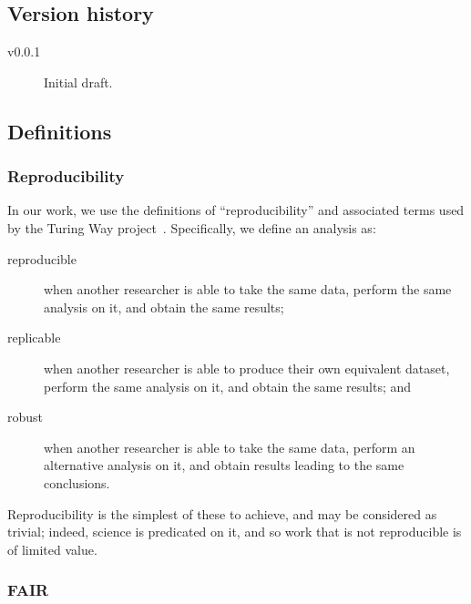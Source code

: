\documentclass{article}
\begin{document}
\tableofcontents

\subsection{Version history}

\begin{description}
  \item[v0.0.1]
        Initial draft.
\end{description}

\subsection{Definitions}

\subsubsection{Reproducibility}\label{sec:reproducibility}

In our work,
we use the definitions of ``reproducibility'' and associated terms
used by the Turing Way project~\cite{the_turing_way_community_2023_7625728}.
Specifically,
we define an analysis as:
\begin{description}
  \item[reproducible]
        when another researcher is able to take the same data,
        perform the same analysis on it,
        and obtain the same results;
  \item[replicable]
        when another researcher is able to produce their own equivalent dataset,
        perform the same analysis on it,
        and obtain the same results;
        and
  \item[robust]
        when another researcher is able to take the same data,
        perform an alternative analysis on it,
        and obtain results leading to the same conclusions.
\end{description}
Reproducibility is the simplest of these to achieve,
and may be considered as trivial;
indeed,
science is predicated on it,
and so work that is not reproducible is of limited value.

\subsubsection{FAIR}
\end{document}
